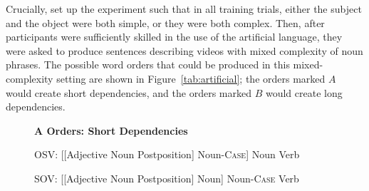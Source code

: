 Crucially, \citet{fedzechkina-human-2017} set up the experiment such that in all training trials, either the subject and the object were both simple, or they were both complex. Then, after participants were sufficiently skilled in the use of the artificial language, they were asked to produce sentences describing videos with mixed complexity of noun phrases. The possible word orders that could be produced in this mixed-complexity setting are shown in Figure~\ref{tab:artificial}; the orders marked $A$ would create short dependencies, and the orders marked $B$ would create long dependencies. 
\begin{figure}
	\textbf{A Orders: Short Dependencies}

	OSV: [[Adjective Noun Postposition] Noun-\textsc{Case}] Noun Verb

	SOV: [[Adjective Noun Postposition] Noun] Noun-\textsc{Case} Verb

%
%


\end{figure}
